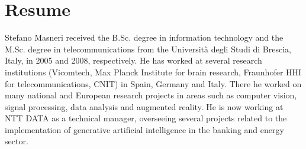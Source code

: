 \chapter{Resume}

Stefano Masneri received the B.Sc. degree in information technology and the M.Sc. degree in telecommunications from the Università degli Studi di Brescia, Italy, in 2005 and 2008, respectively. He has worked at several research institutions (Vicomtech, Max Planck Institute for brain research, Fraunhofer HHI for telecommunications, CNIT) in Spain, Germany and Italy. There he worked on many national and European research projects in areas such as computer vision, signal processing, data analysis and augmented reality. He is now working at NTT DATA as a technical manager, overseeing several projects related to the implementation of generative artificial intelligence in the banking and energy sector.
